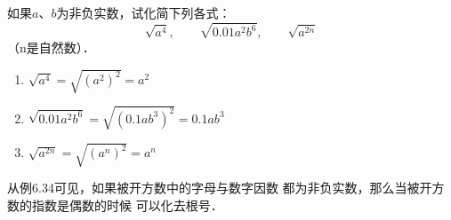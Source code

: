 \begin{example}
    如果$a$、$b$为非负实数，试化简下列各式：
\[\sqrt{a^4},\qquad \sqrt{0.01a^2b^6},\qquad \sqrt{a^{2n}} \]
（n是自然数）．
\end{example}

\begin{solution}
\begin{enumerate}
    \item $\sqrt{a^4}=\sqrt{(a^2)^2}=a^2$
    \item $\sqrt{0.01a^2b^6}=\sqrt{(0.1ab^3)^2}=0.1ab^3$
    \item $\sqrt{a^{2n}}=\sqrt{(a^n)^2}=a^n$
\end{enumerate}
\end{solution}

从例6.34可见，如果被开方数中的字母与数字因数
都为非负实数，那么当被开方数的指数是偶数的时候
可以化去根号．

